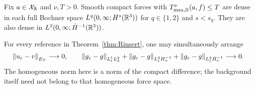 \begin{proposition}\label{prop:Renergy}
Fix $a\in\mathcal X_{\mathbb R}$ and $\nu,T>0$. Smooth compact forces with $T^\nu_{\max,\mathbb R}(a,f)\le T$ are dense in each full Bochner space $L^q(0,\infty;H^s(\mathbb R^3))$ for $q\in\{1,2\}$ and $s<s_q$. They are also dense in $L^2(0,\infty;\dot H^{-1}(\mathbb R^3))$.

For every reference in Theorem~\ref{thm:Rinsert}, one may simultaneously arrange
\[
 \left\lVert u_\varepsilon-v\right\rVert_{E_T}\longrightarrow0,\qquad
 \left\lVert g_\varepsilon-g\right\rVert_{L^1_tL^2_x}
 +\left\lVert g_\varepsilon-g\right\rVert_{L^2_tH^{-1}_x}
 +\left\lVert g_\varepsilon-g\right\rVert_{L^2_t\dot H^{-1}_x}\longrightarrow0.
\]
The homogeneous norm here is a norm of the compact difference; the background itself need not belong to that homogeneous force space.
\end{proposition}

